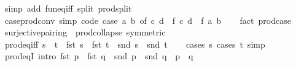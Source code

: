 \begin{isabellebody}
\ {\isacharparenleft}{\kern0pt}simp\ add{\isacharcolon}{\kern0pt}\ fun{\isacharunderscore}{\kern0pt}eq{\isacharunderscore}{\kern0pt}iff\ split{\isacharcolon}{\kern0pt}\ prod{\isachardot}{\kern0pt}split{\isacharparenright}{\kern0pt}%
\endisatagproof
{\isafoldproof}%
%
\isadelimproof
\isanewline
%
\endisadelimproof
\isanewline
{}\isamarkupfalse%
\ case{\isacharunderscore}{\kern0pt}prod{\isacharunderscore}{\kern0pt}conv\ {\isacharbrackleft}{\kern0pt}simp{\isacharcomma}{\kern0pt}\ code{\isacharbrackright}{\kern0pt}{\isacharcolon}{\kern0pt}\ {\isachardoublequoteopen}{\isacharparenleft}{\kern0pt}case\ {\isacharparenleft}{\kern0pt}a{\isacharcomma}{\kern0pt}\ b{\isacharparenright}{\kern0pt}\ of\ {\isacharparenleft}{\kern0pt}c{\isacharcomma}{\kern0pt}\ d{\isacharparenright}{\kern0pt}\ {\isasymRightarrow}\ f\ c\ d{\isacharparenright}{\kern0pt}\ {\isacharequal}{\kern0pt}\ f\ a\ b{\isachardoublequoteclose}\isanewline
%
\isadelimproof
\ \ %
\endisadelimproof
%
\isatagproof
{}\isamarkupfalse%
\ {\isacharparenleft}{\kern0pt}fact\ prod{\isachardot}{\kern0pt}case{\isacharparenright}{\kern0pt}%
\endisatagproof
{\isafoldproof}%
%
\isadelimproof
\isanewline
%
\endisadelimproof
\isanewline
{}\isamarkupfalse%
\ surjective{\isacharunderscore}{\kern0pt}pairing\ {\isacharequal}{\kern0pt}\ prod{\isachardot}{\kern0pt}collapse\ {\isacharbrackleft}{\kern0pt}symmetric{\isacharbrackright}{\kern0pt}\isanewline
\isanewline
{}\isamarkupfalse%
\ prod{\isacharunderscore}{\kern0pt}eq{\isacharunderscore}{\kern0pt}iff{\isacharcolon}{\kern0pt}\ {\isachardoublequoteopen}s\ {\isacharequal}{\kern0pt}\ t\ {\isasymlongleftrightarrow}\ fst\ s\ {\isacharequal}{\kern0pt}\ fst\ t\ {\isasymand}\ snd\ s\ {\isacharequal}{\kern0pt}\ snd\ t{\isachardoublequoteclose}\isanewline
%
\isadelimproof
\ \ %
\endisadelimproof
%
\isatagproof
{}\isamarkupfalse%
\ {\isacharparenleft}{\kern0pt}cases\ s{\isacharcomma}{\kern0pt}\ cases\ t{\isacharparenright}{\kern0pt}\ simp%
\endisatagproof
{\isafoldproof}%
%
\isadelimproof
\isanewline
%
\endisadelimproof
\isanewline
{}\isamarkupfalse%
\ prod{\isacharunderscore}{\kern0pt}eqI\ {\isacharbrackleft}{\kern0pt}intro{\isacharquery}{\kern0pt}{\isacharbrackright}{\kern0pt}{\isacharcolon}{\kern0pt}\ {\isachardoublequoteopen}fst\ p\ {\isacharequal}{\kern0pt}\ fst\ q\ {\isasymLongrightarrow}\ snd\ p\ {\isacharequal}{\kern0pt}\ snd\ q\ {\isasymLongrightarrow}\ p\ {\isacharequal}{\kern0pt}\ q{\isachardoublequoteclose}\isanewline
%
\isadelimproof
\ \ %
\endisadelimproof
%
\isatagproof
{}\isamarkupfalse%

\end{isabellebody}
